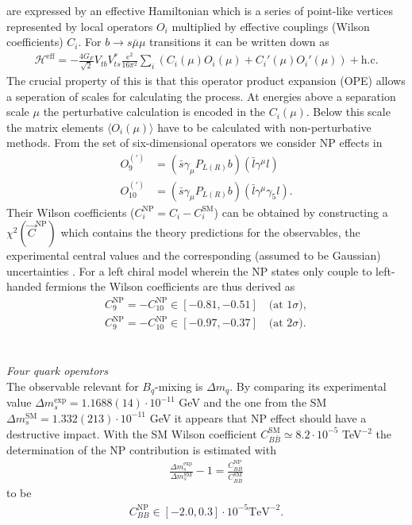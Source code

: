 are expressed by an effective Hamiltonian which is a series of point-like vertices represented by local operators $O_i$ multiplied by effective 
couplings (Wilson coefficients) $C_i$. For $b\rightarrow s\bar\mu\mu$ transitions it can be written down as \cite{1411.3161}
\begin{align}
 \mathcal{H}^\text{eff} = -\frac{4G_F}{\sqrt{2}} V_{tb} V_{ts}^*\frac{e^2}{16\pi^2}\sum\limits_i (C_i(\mu)O_i(\mu) + C_i'(\mu)O_i'(\mu)) + \text{h.c.}
\end{align}
The crucial property of this is that this operator product expansion (OPE) allows a seperation of scales for calculating the process. At energies 
above a separation scale $\mu$ the perturbative calculation is encoded in the $C_i(\mu)$. Below this scale the matrix elements $\langle O_i(\mu)\rangle$
have to be calculated with non-perturbative methods. From the set of six-dimensional operators we consider NP effects in
\begin{align}
 O_9^{(')} &= (\bar s\gamma_\mu P_{L(R)}b)(\bar l\gamma^\mu l)\\
 O_{10}^{(')} &= (\bar s\gamma_\mu P_{L(R)}b)(\bar l\gamma^\mu\gamma_5 l).
\end{align}
Their Wilson coefficients ($C_i^\text{NP} = C_i - C_i^\text{SM}$) can be obtained by constructing a $\chi^2(\vec C^\text{NP})$ which contains the theory predictions for the observables,
the experimental central values and the corresponding (assumed to be Gaussian) uncertainties \cite{150306199}. For a left chiral model wherein the
NP states only couple to left-handed fermions the Wilson coefficients are thus derived as \cite{1608.07832}
\begin{align}
 C_9^\text{NP} = -C_{10}^\text{NP} \in [-0.81,-0.51]\quad \text{(at 1}\sigma), \label{eq_mumuBound1s}\\
 C_9^\text{NP} = -C_{10}^\text{NP} \in [-0.97,-0.37]\quad \text{(at 2}\sigma).
\end{align}
\\ \\ \textit{Four quark operators}\\
The observable relevant for $B_q$-mixing is $\Delta m_q$. By comparing its experimental value 
$\Delta m_s^\text{exp} = 1.1688(14) \cdot 10^{-11}$ GeV \cite{PDG} and the one from the SM 
$\Delta m_s^\text{SM} = 1.332(213)\cdot 10^{-11}$ GeV \cite{0612167} it appears that NP effect should have a destructive impact. 
With the SM Wilson coefficient $C_{B\bar B}^\text{SM} \simeq 8.2\cdot 10^{-5}$ TeV$^{-2}$ \cite{1608.07832} the determination of the NP contribution 
is estimated with 
\begin{align}
 \frac{\Delta m_s^\text{exp}}{\Delta m_s^\text{SM}}-1 = \frac{C^\text{NP}_{B\bar B}}{C^\text{SM}_{B\bar B}}
\end{align}
to be
\begin{align}
 C^\text{NP}_{BB} \in [-2.0,0.3] \cdot 10^{-5} \text{TeV}^{-2}.%
 \label{eq_mixBound}
\end{align}





